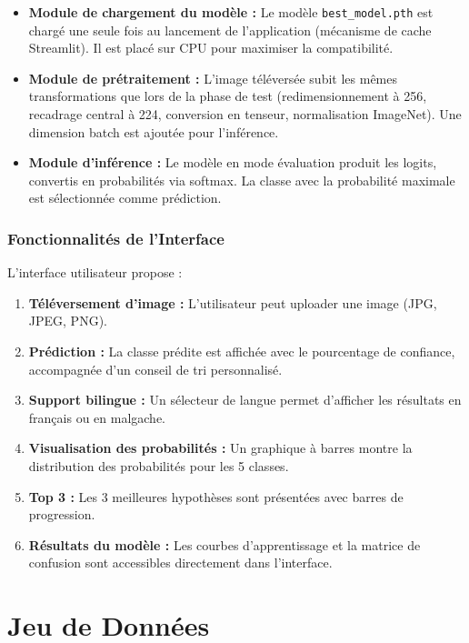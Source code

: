\documentclass[12pt,a4paper]{report}
\begin{document}
\begin{itemize}
    \item \textbf{Module de chargement du modèle :} Le modèle \texttt{best\_model.pth} est chargé une seule fois au lancement de l'application (mécanisme de cache Streamlit). Il est placé sur CPU pour maximiser la compatibilité.
    \item \textbf{Module de prétraitement :} L'image téléversée subit les mêmes transformations que lors de la phase de test (redimensionnement à 256, recadrage central à 224, conversion en tenseur, normalisation ImageNet). Une dimension batch est ajoutée pour l'inférence.
    \item \textbf{Module d'inférence :} Le modèle en mode évaluation produit les logits, convertis en probabilités via softmax. La classe avec la probabilité maximale est sélectionnée comme prédiction.
\end{itemize}

\subsection{Fonctionnalités de l'Interface}
L'interface utilisateur propose :
\begin{enumerate}
    \item \textbf{Téléversement d'image :} L'utilisateur peut uploader une image (JPG, JPEG, PNG).
    \item \textbf{Prédiction :} La classe prédite est affichée avec le pourcentage de confiance, accompagnée d'un conseil de tri personnalisé.
    \item \textbf{Support bilingue :} Un sélecteur de langue permet d'afficher les résultats en français ou en malgache.
    \item \textbf{Visualisation des probabilités :} Un graphique à barres montre la distribution des probabilités pour les 5 classes.
    \item \textbf{Top 3 :} Les 3 meilleures hypothèses sont présentées avec barres de progression.
    \item \textbf{Résultats du modèle :} Les courbes d'apprentissage et la matrice de confusion sont accessibles directement dans l'interface.
\end{enumerate}

\chapter{Jeu de Données}
\end{document}
